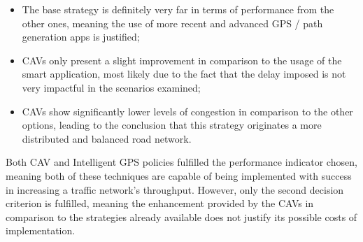 \begin{itemize}
    \item The base strategy is definitely very far in terms of performance from the other ones, meaning the use of more recent and advanced GPS / path generation apps is justified;
    \item CAVs only present a slight improvement in comparison to the usage of the smart application, most likely due to the fact that the delay imposed is not very impactful in the scenarios examined;
    \item CAVs show significantly lower levels of congestion in comparison to the other options, leading to the conclusion that this strategy originates a more distributed and balanced road network.
\end{itemize}

Both CAV and Intelligent GPS policies fulfilled the performance indicator chosen, meaning both of these techniques are capable of being implemented with success in increasing a traffic network's throughput. However, only the second decision criterion is fulfilled, meaning the enhancement provided by the CAVs in comparison to the strategies already available does not justify its possible costs of implementation. 